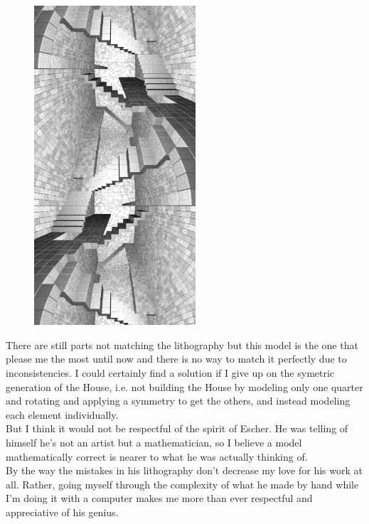 \documentclass[12pt, a4paper]{article}
\begin{document}
\begin{center}
\begin{figure}[H]
\centering
\includegraphics[width=6cm]{./XL-51_12.png}\\
\end{figure}
\end{center}

There are still parts not matching the lithography but this model is the one that please me the most until now and there is no way to match it perfectly due to inconsistencies. I could certainly find a solution if I give up on the symetric generation of the House, i.e. not building the House by modeling only one quarter and rotating and applying a symmetry to get the others, and instead modeling each element individually.\\

But I think it would not be respectful of the spirit of Escher. He was telling of himself he's not an artist but a mathematician, so I believe a model mathematically correct is nearer to what he was actually thinking of.\\

By the way the mistakes in his lithography don't decrease my love for his work at all. Rather, going myself through the complexity of what he made by hand while I'm doing it with a computer makes me more than ever respectful and appreciative of his genius.\\
\end{document}
